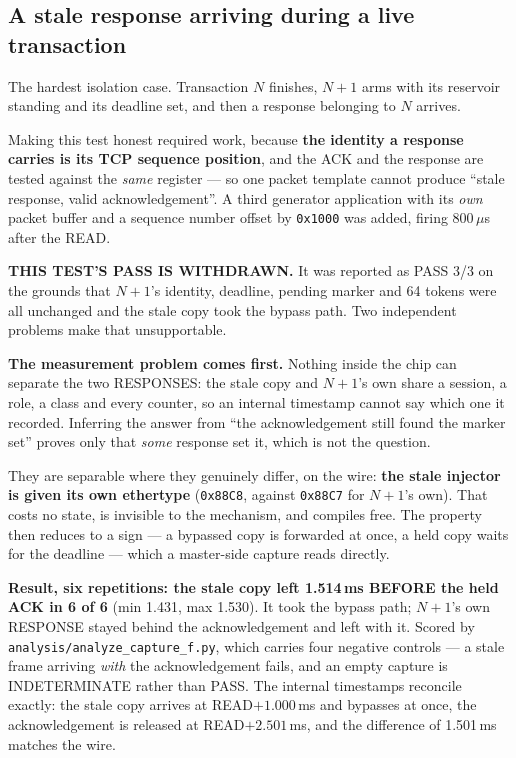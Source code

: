 \documentclass[10pt,a4paper,oneside]{article}
\newenvironment{keybox}{\begin{snugshade}\noindent\ignorespaces}{\end{snugshade}}
\newcommand{\num}[1]{\mbox{#1}}
\newcommand{\code}[1]{\texttt{\small #1}}
\begin{document}
\subsection{A stale response arriving during a live transaction}
\label{sec:stale}

The hardest isolation case. Transaction $N$ finishes, $N{+}1$ arms with its reservoir
standing and its deadline set, and then a response belonging to $N$ arrives.

Making this test honest required work, because \textbf{the identity a response carries is
its TCP sequence position}, and the ACK and the response are tested against the \emph{same}
register --- so one packet template cannot produce ``stale response, valid
acknowledgement''. A third generator application with its \emph{own} packet buffer and a
sequence number offset by \code{0x1000} was added, firing 800\,$\mu$s after the READ.

\begin{keybox}
\textbf{\textcolor{warnc}{THIS TEST'S PASS IS WITHDRAWN.}} It was reported as PASS
3/3 on the grounds that $N{+}1$'s identity, deadline, pending marker and 64 tokens were all
unchanged and the stale copy took the bypass path. Two independent problems make that
unsupportable.
\end{keybox}

\textbf{The measurement problem comes first.} Nothing inside the chip can separate the two
RESPONSES: the stale copy and $N{+}1$'s own share a session, a role, a class and every
counter, so an internal timestamp cannot say which one it recorded. Inferring the answer from
``the acknowledgement still found the marker set'' proves only that \emph{some} response set
it, which is not the question.

They are separable where they genuinely differ, on the wire: \textbf{the stale injector is
given its own ethertype} (\code{0x88C8}, against \code{0x88C7} for $N{+}1$'s own). That costs
no state, is invisible to the mechanism, and compiles free. The property then reduces to a
sign --- a bypassed copy is forwarded at once, a held copy waits for the deadline --- which a
master-side capture reads directly.

\textbf{Result, six repetitions: the stale copy left \num{1.514}\,ms BEFORE the held ACK in 6
of 6} (min \num{1.431}, max \num{1.530}). It took the bypass path; $N{+}1$'s own RESPONSE
stayed behind the acknowledgement and left with it. Scored by
\code{analysis/analyze\_capture\_f.py}, which carries four negative controls --- a stale frame
arriving \emph{with} the acknowledgement fails, and an empty capture is INDETERMINATE rather
than PASS. The internal timestamps reconcile exactly: the stale copy arrives at
READ${+}\num{1.000}$\,ms and bypasses at once, the acknowledgement is released at
READ${+}\num{2.501}$\,ms, and the difference of \num{1.501}\,ms matches the wire.
\end{document}
